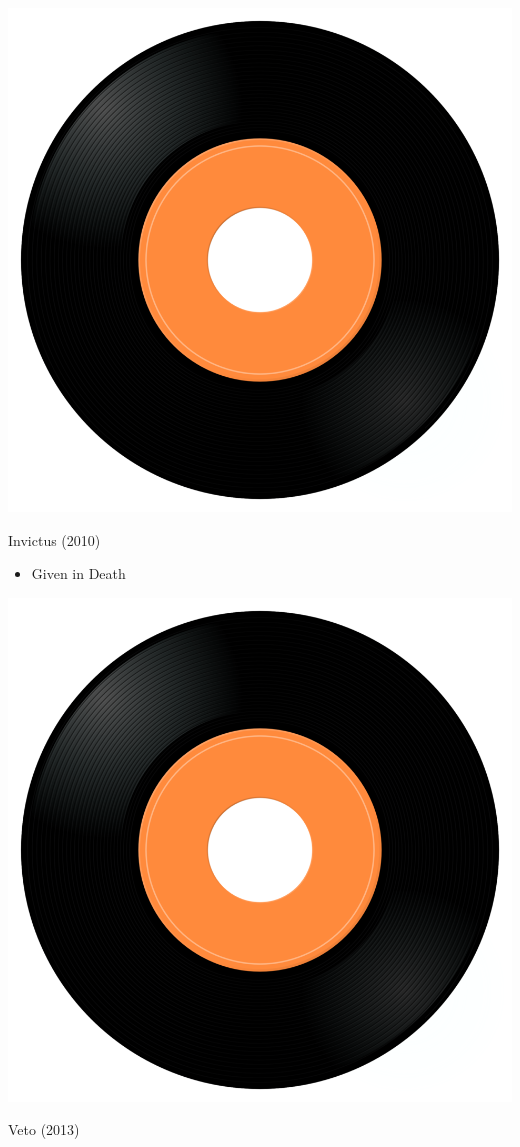 \begin{minipage}[t]{0.25\textwidth}
\captionsetup{type=figure}
\includegraphics[width=\textwidth]{Images/cover.png}
\caption*{Invictus (2010)}
\end{minipage}
\begin{minipage}[t]{0.25\textwidth}\vspace{0pt}
\begin{itemize}[nosep,leftmargin=1em,labelwidth=*,align=left]
	\setlength{\itemsep}{0pt}
	\item Given in Death
\end{itemize}
\end{minipage}
\begin{minipage}[t]{0.25\textwidth}
\captionsetup{type=figure}
\includegraphics[width=\textwidth]{Images/cover.png}
\caption*{Veto (2013)}
\end{minipage}
